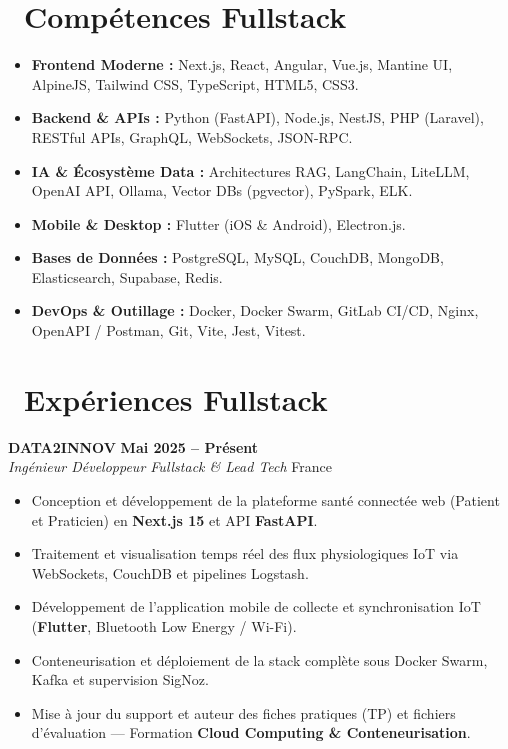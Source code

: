 \documentclass[10pt,a4paper]{article}
\begin{document}
\section{\faCogs\ Compétences Fullstack}
\begin{itemize}[leftmargin=1.4em, itemsep=0.25em, topsep=0.15em]
    \item \textbf{Frontend Moderne :} Next.js, React, Angular, Vue.js, Mantine UI, AlpineJS, Tailwind CSS, TypeScript, HTML5, CSS3.
    \item \textbf{Backend \& APIs :} Python (FastAPI), Node.js, NestJS, PHP (Laravel), RESTful APIs, GraphQL, WebSockets, JSON-RPC.
    \item \textbf{IA \& Écosystème Data :} Architectures RAG, LangChain, LiteLLM, OpenAI API, Ollama, Vector DBs (pgvector), PySpark, ELK.
    \item \textbf{Mobile \& Desktop :} Flutter (iOS \& Android), Electron.js.
    \item \textbf{Bases de Données :} PostgreSQL, MySQL, CouchDB, MongoDB, Elasticsearch, Supabase, Redis.
    \item \textbf{DevOps \& Outillage :} Docker, Docker Swarm, GitLab CI/CD, Nginx, OpenAPI / Postman, Git, Vite, Jest, Vitest.
\end{itemize}

\section{\faBriefcase\ Expériences Fullstack}

\textbf{\large DATA2INNOV} \hfill {\bfseries\small\color{slateGray} Mai 2025 -- Présent} \\
\emph{\color{primary}Ingénieur Développeur Fullstack \& Lead Tech} \hfill {\small France}
\begin{itemize}[leftmargin=1.4em, itemsep=0.18em, topsep=0.15em]
    \item Conception et développement de la plateforme santé connectée web (Patient et Praticien) en \textbf{Next.js 15} et API \textbf{FastAPI}.
    \item Traitement et visualisation temps réel des flux physiologiques IoT via WebSockets, CouchDB et pipelines Logstash.
    \item Développement de l'application mobile de collecte et synchronisation IoT (\textbf{Flutter}, Bluetooth Low Energy / Wi-Fi).
    \item Conteneurisation et déploiement de la stack complète sous Docker Swarm, Kafka et supervision SigNoz.
    \item Mise à jour du support et auteur des fiches pratiques (TP) et fichiers d'évaluation --- Formation \textbf{Cloud Computing \& Conteneurisation}.
\end{itemize}
\end{document}
